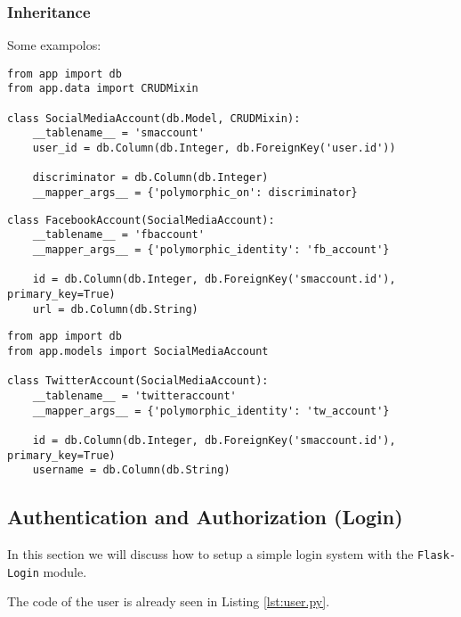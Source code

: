 \documentclass[../main/main.tex]{subfiles}
\begin{document}
\subsubsection{Inheritance}
\label{sec:inheritance}

Some exampolos: 

\begin{lstlisting}
from app import db
from app.data import CRUDMixin

class SocialMediaAccount(db.Model, CRUDMixin):
    __tablename__ = 'smaccount'
    user_id = db.Column(db.Integer, db.ForeignKey('user.id'))

    discriminator = db.Column(db.Integer)
    __mapper_args__ = {'polymorphic_on': discriminator}  
\end{lstlisting}

\begin{lstlisting}
class FacebookAccount(SocialMediaAccount):
    __tablename__ = 'fbaccount'
    __mapper_args__ = {'polymorphic_identity': 'fb_account'}

    id = db.Column(db.Integer, db.ForeignKey('smaccount.id'), primary_key=True)
    url = db.Column(db.String)
\end{lstlisting}


\begin{lstlisting}
from app import db
from app.models import SocialMediaAccount

class TwitterAccount(SocialMediaAccount):
    __tablename__ = 'twitteraccount'
    __mapper_args__ = {'polymorphic_identity': 'tw_account'}

    id = db.Column(db.Integer, db.ForeignKey('smaccount.id'), primary_key=True)
    username = db.Column(db.String)  
\end{lstlisting}

\subsection{Authentication and Authorization (Login)}
\label{sec:auth}

In this section we will discuss how to setup a simple login system
with the \lstinline|Flask-Login| module. 

The code of the user is already seen in Listing \ref{lst:user.py}. 

% 
\end{document}
